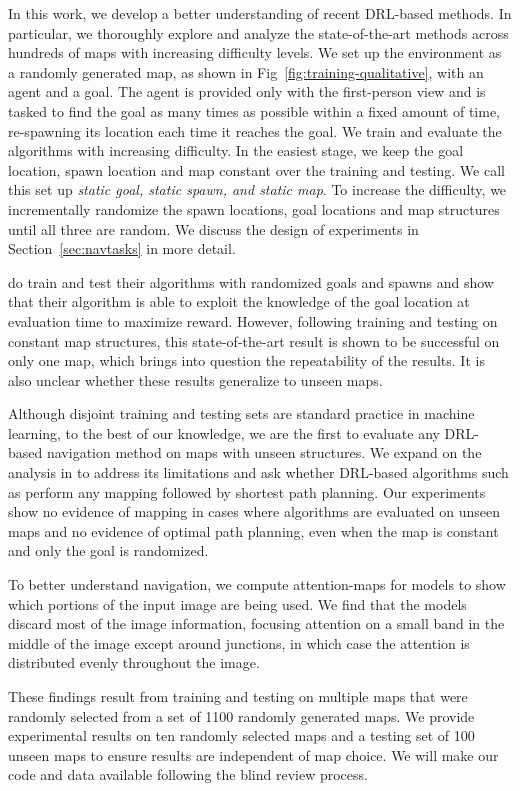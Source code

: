 In this work, we develop a better understanding of recent DRL-based methods. In particular, we thoroughly explore and analyze the state-of-the-art \cite{MiPaViICLR2017} methods across hundreds of maps with increasing difficulty levels. 
We set up the environment as a randomly generated map, as shown in Fig~\ref{fig:training-qualitative}, with an agent and a goal.
The agent is provided only with the first-person view and is tasked to find the goal as many times as possible within a fixed amount of time, re-spawning its location each time it reaches the goal. 
We train and evaluate the algorithms with increasing difficulty.
In the easiest stage, we keep the goal location, spawn location and map constant over the training and testing.
We call this set up \emph{static goal, static spawn, and static map}.
To increase the difficulty, we incrementally randomize the spawn locations, goal locations and map structures until all three are random.
We discuss the design of experiments in Section~\ref{sec:navtasks} in more detail.

\cite{MiPaViICLR2017} do train and test their algorithms with randomized goals and spawns and show that their algorithm is able to exploit the knowledge of the goal location at evaluation time to maximize reward.
However, following training and testing on constant map structures, this state-of-the-art result is shown to be successful on only one map, which brings into question the repeatability of the results.
It is also unclear whether these results generalize to unseen maps.

Although disjoint training and testing sets are standard practice in machine learning, to the best of our knowledge, we are the first to evaluate any DRL-based navigation method on maps with unseen structures.
We expand on the analysis in \cite{MiPaViICLR2017} to address its limitations and ask whether DRL-based algorithms such as \NavAiiiCDiDiiL{} perform any mapping followed by shortest path planning.
Our experiments show no evidence of mapping in cases where algorithms are evaluated on unseen maps and no evidence of optimal path planning, even when the map is constant and only the goal is randomized.

To better understand navigation, we compute attention-maps for models to show which portions of the input image are being used.
We find that the models discard most of the image information, focusing attention on a small band in the middle of the image except around junctions, in which case the attention is distributed evenly throughout the image.

These findings result from training and testing on multiple maps that were randomly selected from a set of 1100 randomly generated maps.
We provide experimental results on ten randomly selected maps and a testing set of 100 unseen maps to ensure results are independent of map choice.
We will make our code and data available following the blind review process.

